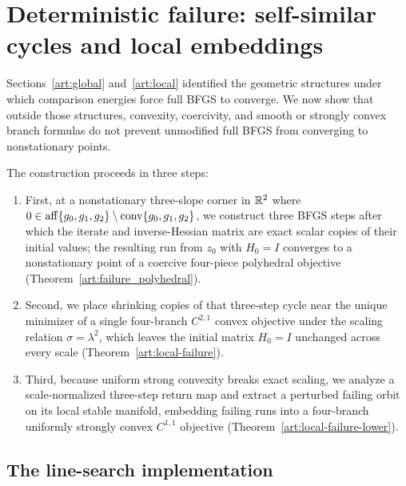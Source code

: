 \section{Deterministic failure: self-similar cycles and local embeddings}
\label{art:failure}

Sections~\ref{art:global} and~\ref{art:local} identified the geometric
structures under which comparison energies force full BFGS to converge. We now
show that outside those structures, convexity, coercivity, and smooth or
strongly convex branch formulas do not prevent unmodified full BFGS from
converging to nonstationary points.

The construction proceeds in three steps:
\begin{enumerate}
\item First, at a nonstationary three-slope corner in $\mathbb R^2$ where
$0\in\operatorname{aff}\{g_0,g_1,g_2\}\setminus\operatorname{conv}\{g_0,g_1,g_2\}$, we construct three BFGS
steps after which the iterate and inverse-Hessian matrix are exact scalar copies
of their initial values; the resulting run from $z_0$ with $H_0=I$ converges to
a nonstationary point of a coercive four-piece polyhedral objective
(Theorem~\ref{art:failure_polyhedral}).
\item Second, we place shrinking copies of that three-step cycle near the unique
minimizer of a single four-branch $C^{2,1}$ convex objective under the scaling
relation $\sigma=\lambda^2$, which leaves the initial matrix $H_0=I$ unchanged
across every scale (Theorem~\ref{art:local-failure}).
\item Third, because uniform strong convexity breaks exact scaling, we analyze a
scale-normalized three-step return map and extract a perturbed failing orbit on
its local stable manifold, embedding failing runs into a four-branch uniformly
strongly convex $C^{1,1}$ objective (Theorem~\ref{art:local-failure-lower}).
\end{enumerate}

\subsection{The line-search implementation}

